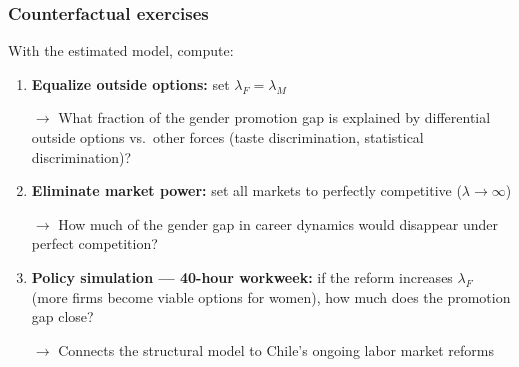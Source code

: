 \documentclass[aspectratio=169, 11pt]{beamer}
\begin{document}
\begin{frame}
\frametitle{Counterfactual exercises}

With the estimated model, compute:

\vspace{0.3cm}
\begin{enumerate}
    \item \textbf{Equalize outside options:} set $\lambda_F = \lambda_M$

    $\to$ What fraction of the gender promotion gap is explained by differential outside options vs.\ other forces (taste discrimination, statistical discrimination)?
    \bigskip

    \item \textbf{Eliminate market power:} set all markets to perfectly competitive ($\lambda \to \infty$)

    $\to$ How much of the gender gap in career dynamics would disappear under perfect competition?
    \bigskip

    \item \textbf{Policy simulation --- 40-hour workweek:} if the reform increases $\lambda_F$ (more firms become viable options for women), how much does the promotion gap close?

    $\to$ Connects the structural model to Chile's ongoing labor market reforms
\end{enumerate}


\end{frame}

\appendix
{} %
\end{document}
